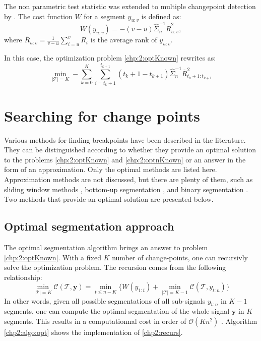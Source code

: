 The non parametric test statistic was extended to multiple changepoint detection by \cite{lung2015}. The cost function $W$ for a segment $y_{u:v}$ is defined as: 
\begin{equation}
  W(y_{u:v}) = -(v-u)\hat{\Sigma}^{-1}_n\overline{R}^2_{u:v},
\end{equation}
where $\overline{R}_{u:v} = \frac{1}{v-u}\sum_{i = u}^vR_i$ is the average rank of $y_{u:v}$.

In this case, the optimization problem \ref{chp:2:optKnown} rewrites as: 
\begin{equation}\label{chp:2:npcost}
\min_{\lvert\mathcal{T}\rvert = K}  -\sum_{k=0}^K \sum_{i = t_k+1}^{t_{k+1}} (t_k+1-t_{k+1})\hat{\Sigma}^{-1}_n\overline{R}^2_{t_k+1:t_{k+1}}
\end{equation}       

\section{Searching for change points}

Various methods for finding breakpoints have been described in the literature. They can be distinguished according to whether they provide an optimal solution to the problems \ref{chp:2:optKnown} and \ref{chp:2:optnKnown} or an answer in the form of an approximation. Only the optimal methods are listed here. Approximation methods are not discussed, but there are plenty of them, such as sliding window methods \cite{Li2010,Liu2022}, bottom-up segmentation \cite{chen1998speaker}, and binary segmentation \cite{Yang2001,Fryzlewicz2014}. Two methods that provide an optimal solution are presented below.

\subsection{Optimal segmentation approach}\label{chp2:opt}

The optimal segmentation algorithm brings an answer to problem \ref{chp:2:optKnown}. With a fixed $K$ number of change-points, one can recursivly solve the optimization problem. The recursion comes from the following relationship: 
\begin{equation}\label{chp2:recurs}
\min_{\lvert\mathcal{T}\rvert = K}\mathcal{C}(\mathcal{T},\bm y) = \min_{t \leq n-K}\{W(y_{1:t})+\min_{\lvert\mathcal{T}\rvert = K-1}\mathcal{C}(\mathcal{T}, y_{t:n})\} 
\end{equation}
In other words, given all possible segmentations of all sub-signals $y_{t:n}$ in $K-1$ segments, one can compute the optimal segmentation of the whole signal $\bm y$ in $K$ segments. This results in a computationnal cost in order of $\mathcal{O}(Kn^2)$ \cite{haynes2017}. Algorithm \ref{chp2:algo:opt} shows the implementation of \ref{chp2:recurs}. 


